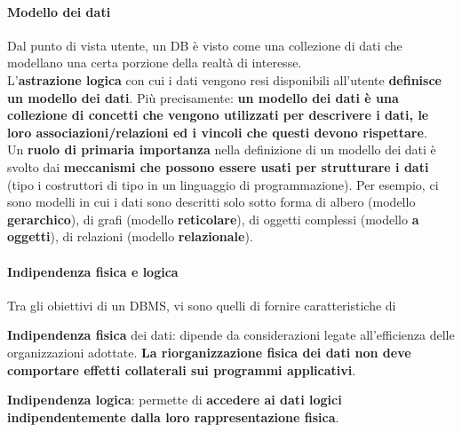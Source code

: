 \documentclass[10pt]{book}
\begin{document}
\paragraph{Modello dei dati} Dal punto di vista utente, un DB è visto come una collezione di dati che modellano una certa porzione della realtà di interesse.\\
L'\textbf{astrazione logica} con cui i dati vengono resi disponibili all'utente \textbf{definisce un modello dei dati}. Più precisamente: \textbf{un modello dei dati è una collezione di concetti che vengono utilizzati per descrivere i dati, le loro associazioni/relazioni ed i vincoli che questi devono rispettare}.\\
Un \textbf{ruolo di primaria importanza} nella definizione di un modello dei dati è svolto dai \textbf{meccanismi che possono essere usati per strutturare i dati} (tipo i costruttori di tipo in un linguaggio di programmazione). Per esempio, ci sono modelli in cui i dati sono descritti solo sotto forma di albero (modello \textbf{gerarchico}), di grafi (modello \textbf{reticolare}), di oggetti complessi (modello \textbf{a oggetti}), di relazioni (modello \textbf{relazionale}).
\paragraph{Indipendenza fisica e logica} Tra gli obiettivi di un DBMS, vi sono quelli di fornire caratteristiche di
\begin{list}{}{}
	\item \textbf{Indipendenza fisica} dei dati: dipende da considerazioni legate all'efficienza delle organizzazioni adottate. \textbf{La riorganizzazione fisica dei dati non deve comportare effetti collaterali sui programmi applicativi}.
	\item \textbf{Indipendenza logica}: permette di \textbf{accedere ai dati logici indipendentemente dalla loro rappresentazione fisica}.
\end{list}
\pagebreak
\end{document}
